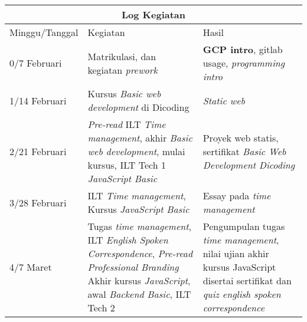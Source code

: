 \begin{tabular}{ |p{3cm}|p{6cm}|p{3cm}|  }
 \hline
 \multicolumn{3}{|c|}{Log Kegiatan} \\
 \hline
 Minggu/Tanggal & Kegiatan & Hasil\\
 \hline
 0/7 Februari & Matrikulasi, dan kegiatan \textit{prework} & \textbf{GCP intro}, gitlab usage, \textit{programming intro} \\
 \hline
 1/14 Februari & Kursus \textit{Basic web development} di Dicoding & \textit{Static web} \\
 \hline
 2/21 Februari & \textit{Pre-read} ILT \textit{Time management}, akhir \textit{Basic web development}, mulai kursus, ILT Tech 1 \textit{JavaScript Basic} & Proyek web statis, sertifikat \textit{Basic Web Development Dicoding} \\
 \hline
 3/28 Februari & ILT \textit{Time management}, Kursus \textit{JavaScript Basic} & Essay pada \textit{time management} \\
 \hline
 4/7 Maret & Tugas \textit{time management}, ILT \textit{English Spoken Correspondence}, \textit{Pre-read Professional Branding} Akhir kursus \textit{JavaScript}, awal \textit{Backend Basic}, ILT Tech 2 & Pengumpulan tugas \textit{time management}, nilai ujian akhir kursus JavaScript disertai sertifikat dan \textit{quiz english spoken correspondence} \\
 \hline
\end{tabular}
